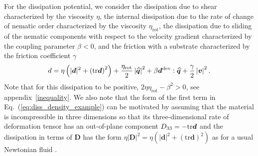 For the dissipation potential, we consider the dissipation due to shear characterized by the viscosity $\eta$, the internal dissipation due to the rate of change of nematic order characterized by the viscosity $\eta_{\text{rot}}$, the dissipation due to sliding of the nematic components with respect to the velocity gradient characterized by the coupling parameter $\beta<0$, and the friction with a substrate characterized by the friction coefficient $\gamma$
\begin{equation}
	\label{eq:diss_density_example}
	d =  \eta \left(|\bm{d}|^2 + \left(\text{tr}\bm{d}\right)^2\right) +\frac{\eta_{\text{rot}}}{2}  \left|\widehat{\bm{q}}\right|^2+ \beta  \bm{d}^{\rm dev}:\widehat{\bm{q}}  + \frac{\gamma}{2} \left|\bm{v}\right|^2.
\end{equation}
Note that for this dissipation to be positive, $2\eta \eta_{\text{rot}} - \beta^2 > 0$, see appendix~\ref{inequality}. We also note that the form of the first term in Eq.~(\ref{eq:diss_density_example}) can be motivated by assuming that the material is incompressible in three dimensions so that its three-dimensional rate of deformation tensor has an out-of-plane component $D_{33} = -{\rm tr} \bm{d}$ and the dissipation in terms of $\bm{D}$ has the form $\eta |\bm{D}|^2= \eta(|\bm{d}|^2 + \left(\text{tr}\bm{d}\right)^2)$ as for a usual Newtonian fluid \cite{salbreux2009}.

